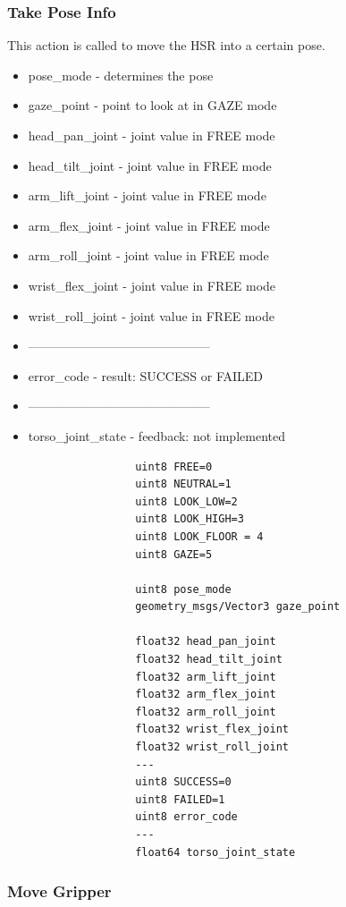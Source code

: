 \documentclass[main.tex]{subfiles}
\begin{document}
					\subsubsection{Take Pose Info}
						This action is called to move the HSR into a certain pose.
						\begin{itemize}
							\item pose\_mode - determines the pose
							\item gaze\_point - point to look at in GAZE mode
							\item head\_pan\_joint - joint value in FREE mode
							\item head\_tilt\_joint - joint value in FREE mode
							\item arm\_lift\_joint - joint value in FREE mode
							\item arm\_flex\_joint - joint value in FREE mode
							\item arm\_roll\_joint - joint value in FREE mode
							\item wrist\_flex\_joint - joint value in FREE mode
							\item wrist\_roll\_joint - joint value in FREE mode
							\item --------------------------------------------
							\item error\_code - result: SUCCESS or FAILED
							\item --------------------------------------------
							\item torso\_joint\_state - feedback: not implemented
						\end{itemize}
					\begin{lstlisting}
					uint8 FREE=0
					uint8 NEUTRAL=1
					uint8 LOOK_LOW=2
					uint8 LOOK_HIGH=3
					uint8 LOOK_FLOOR = 4
					uint8 GAZE=5
		
					uint8 pose_mode
					geometry_msgs/Vector3 gaze_point
		
					float32 head_pan_joint
					float32 head_tilt_joint
					float32 arm_lift_joint
					float32 arm_flex_joint
					float32 arm_roll_joint
					float32 wrist_flex_joint
					float32 wrist_roll_joint
					---
					uint8 SUCCESS=0
					uint8 FAILED=1
					uint8 error_code
					---
					float64 torso_joint_state
					\end{lstlisting}
				\subsubsection{Move Gripper}
				\label{msg_move_gripper}
\end{document}
